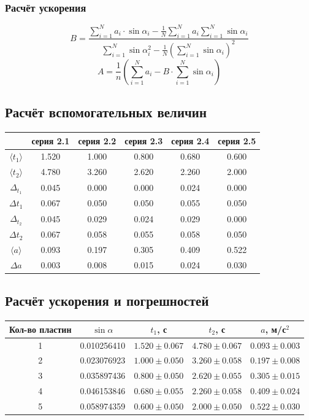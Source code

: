\documentclass[12pt,a4paper]{article}
\begin{document}
\subsubsection{Расчёт ускорения}
$$B=\frac{\sum^N_{i=1}{a_i\cdot\sin\alpha_i}-\frac{1}{N}\sum^N_{i=1}{a_i}\sum^N_{i=1}\sin\alpha_i}{\sum^N_{i=1}\sin\alpha_i^2-\frac{1}{N}(\sum^N_{i=1}{\sin \alpha_i})^2}$$
$$A=\frac{1}{n}(\sum^N_{i=1}a_i-B\cdot\sum^N_{i=1}\sin\alpha_i)$$
\subsection{Расчёт вспомогательных величин}
\begin{tabular}{|c|c|c|c|c|c|}
    \hline
    & серия 2.1 & серия 2.2 & серия 2.3 & серия 2.4 & серия 2.5 \\
    \hline
    $\langle t_1 \rangle$ & 1.520 & 1.000 & 0.800 & 0.680 & 0.600 \\
    \hline
    $\langle t_2 \rangle$ & 4.780 & 3.260 & 2.620 & 2.260 & 2.000 \\
    \hline
    $\Delta_{t_1}$ & 0.045 & 0.000 & 0.000 & 0.024 & 0.000 \\
    \hline
    $\Delta t_1$ & 0.067 & 0.050 & 0.050 & 0.055 & 0.050 \\
    \hline
    $\Delta_{t_2}$ & 0.045 & 0.029 & 0.024 & 0.029 & 0.000 \\
    \hline
    $\Delta t_2$ & 0.067 & 0.058 & 0.055 & 0.058 & 0.050 \\
    \hline
    $\langle a \rangle$ & 0.093 & 0.197 & 0.305 & 0.409 & 0.522 \\
    \hline
    $\Delta a$ & 0.003 & 0.008 & 0.015 & 0.024 & 0.030 \\
    \hline
\end{tabular}
\subsection{Расчёт ускорения и погрешностей}
\begin{tabular}{|c|c|c|c|c|}
    \hline
    Кол-во пластин & $\sin\alpha$ & $t_1$, с & $t_2$, с & $a$, м/с$^2$ \\
    \hline
    1 & 0.010256410 & $1.520 \pm 0.067$ & $4.780 \pm 0.067$ & $0.093 \pm 0.003$ \\
    \hline
    2 & 0.023076923 & $1.000 \pm 0.050$ & $3.260 \pm 0.058$ & $0.197 \pm 0.008$ \\
    \hline
    3 & 0.035897436 & $0.800 \pm 0.050$ & $2.620 \pm 0.055$ & $0.305 \pm 0.015$ \\
    \hline
    4 & 0.046153846 & $0.680 \pm 0.055$ & $2.260 \pm 0.058$ & $0.409 \pm 0.024$ \\
    \hline
    5 & 0.058974359 & $0.600 \pm 0.050$ & $2.000 \pm 0.050$ & $0.522 \pm 0.030$ \\
    \hline
\end{tabular}
\end{document}
